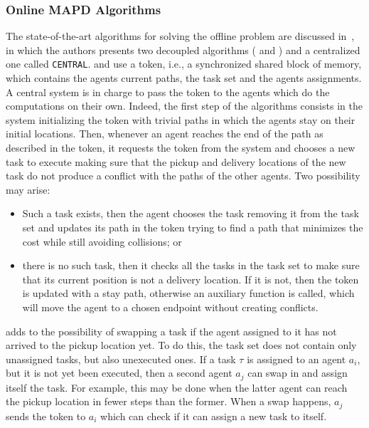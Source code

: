 \subsubsection{Online MAPD Algorithms}
The state-of-the-art algorithms for solving the offline  problem are
discussed in~\cite{onlineMAPD}, in which the authors presents two decoupled 
algorithms ( and ) and a centralized one called
\texttt{CENTRAL}. \newline
{} and  use a token, i.e., a synchronized shared block of
memory, which contains the agents current paths, the task set and the agents
assignments. A central system is in charge to pass the token to the agents
which do the computations on their own. Indeed, the first step of the
algorithms consists in the system initializing the token with trivial paths in
which the agents stay on their initial locations. Then, whenever an agent 
reaches the end of the path as described in the token, it requests the token
from the system and chooses a new task to execute making sure that the pickup
and delivery locations of the new task do not produce a conflict with the paths
of the other agents. Two possibility may arise:
\begin{itemize}
  \item Such a task exists, then the agent chooses the task removing it from
    the task set and updates its path in the token trying to find a path that
    minimizes the cost while still avoiding collisions; or
  \item there is no such task, then it checks all the tasks in the task set to
    make sure that its current position is not a delivery location. If it
    is not, then the token is updated with a stay path, otherwise an auxiliary
    function is called, which will move the agent to a chosen endpoint without
    creating conflicts. 
\end{itemize}
 adds to  the possibility of swapping a task if the agent
assigned to it has not arrived to the pickup location yet. To do this, the task
set does not contain only unassigned tasks, but also unexecuted ones. If a task
$\tau$ is assigned to an agent $a_i$, but it is not yet been executed, then a
second agent $a_j$ can swap in and assign itself the task. For example, this
may be done when the latter agent can reach the pickup location in fewer steps 
than the former. When a swap happens, $a_j$ sends the token to $a_i$ which can
check if it can assign a new task to itself. 
%
